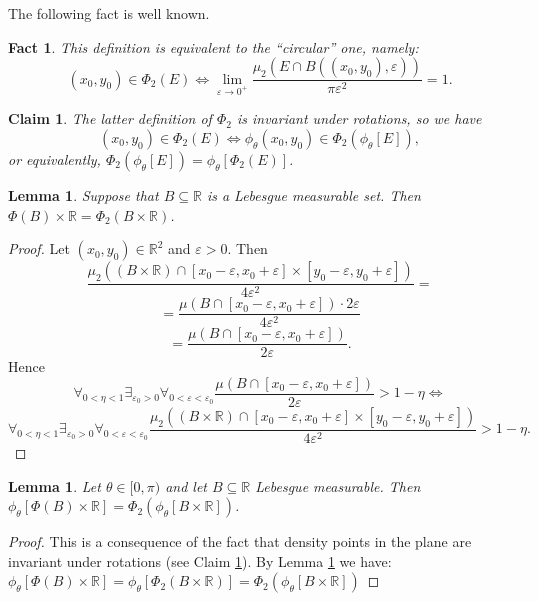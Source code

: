 \documentclass[12pt]{amsart}
\theoremstyle{plain}
\newtheorem{lemma}[theorem]{Lemma}
\newtheorem{claim}[theorem]{Claim}
\newtheorem{fact}[theorem]{Fact}
\theoremstyle{definition}
\theoremstyle{remark}
\newcommand{\real}{\mathbb{R}}
\begin{document}
The following fact is well known.
\begin{fact}
  This definition is equivalent to the ``circular'' one, namely:
\[
  (x_0, y_0) \in \Phi_2(E) \iff
  \lim_{\varepsilon\to 0^+}
  \frac{\mu_2(E \cap B((x_0, y_0), \varepsilon))}{\pi \varepsilon^2} = 1.
\]  
\end{fact}

\begin{claim}\label{claim:density-point-rotation}
The latter definition of $\Phi_2$ is invariant under rotations,
so we have
\[
  (x_0, y_0) \in \Phi_2(E) \iff \phi_\theta(x_0, y_0) \in \Phi_2(\phi_\theta[E]),
\]
or equivalently, $\Phi_2(\phi_\theta[E]) = \phi_\theta[\Phi_2(E)]$.
\end{claim}
\begin{lemma}\label{lemma:rotation-measurable-stripe}
  Suppose that $B \subseteq \real$ is a Lebesgue measurable set.
  Then $\Phi(B) \times \real = \Phi_2(B \times \real)$.
\end{lemma}
\begin{proof}
  Let $(x_0, y_0) \in \real^2$ and $\varepsilon > 0$.
  Then
\[
  \frac{\mu_2((B \times \real) \cap [x_0 - \varepsilon, x_0 + \varepsilon] \times
   [y_0 - \varepsilon, y_0 + \varepsilon])}{4 \varepsilon^2} = 
\]
\[
  = \frac{\mu(B \cap [x_0 - \varepsilon, x_0 + \varepsilon]) \cdot 2\varepsilon}{4\varepsilon^2}
\]
\[
= \frac{\mu(B \cap [x_0 - \varepsilon, x_0 + \varepsilon])}{2\varepsilon}.
\]
Hence
\[
\forall_{0 < \eta < 1} \exists_{\varepsilon_0 > 0} \forall_{0 < \varepsilon < \varepsilon_0}
  \frac{\mu(B \cap [x_0 - \varepsilon, x_0 + \varepsilon])}{2\varepsilon} > 1 - \eta \iff
\]
\[
  \forall_{0 < \eta < 1} \exists_{\varepsilon_0 > 0} \forall_{0 < \varepsilon < \varepsilon_0}
  \frac{\mu_2((B \times \real) \cap [x_0 - \varepsilon, x_0 + \varepsilon] \times
   [y_0 - \varepsilon, y_0 + \varepsilon])}{4 \varepsilon^2} > 1 - \eta. 
\]
\end{proof}

\begin{lemma}
  Let $\theta \in [0, \pi)$ and let $B\subseteq\real$ Lebesgue measurable. Then
  $\phi_{\theta} [\Phi(B) \times \real] = \Phi_2(\phi_{\theta} [B\times\real])$.
\end{lemma}

\begin{proof}
  This is a consequence of the fact that density points in the plane are
  invariant under rotations (see Claim \ref{claim:density-point-rotation}).
  By Lemma \ref{lemma:rotation-measurable-stripe} we have:
  $\phi_{\theta} [\Phi(B) \times \real] = \phi_{\theta}[\Phi_2(B\times\real)] =
  \Phi_2(\phi_\theta [B\times\real])$
\end{proof}
\end{document}
